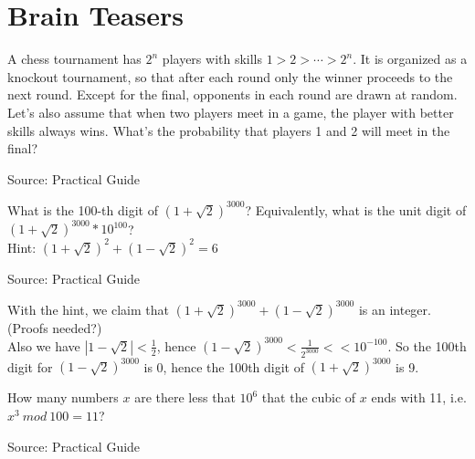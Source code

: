 \chapter{Brain Teasers}

\begin{exe}
A chess tournament has $2^n$ players with skills $1>2>\cdots>2^n$. It is organized as a
knockout tournament, so that after each round only the winner proceeds to the next
round. Except for the final, opponents in each round are drawn at random. Let's also
assume that when two players meet in a game, the player with better skills always wins.
What's the probability that players 1 and 2 will meet in the final?
\end{exe}
\begin{teacher}
Source: Practical Guide
\begin{sol}
\end{sol}
\end{teacher}

\begin{exe}[100th digit]
What is the 100-th digit of $(1+\sqrt{2})^{3000}$? Equivalently, what is the unit digit of $(1+\sqrt{2})^{3000}*10^{100}$?\\
Hint: $(1+\sqrt{2})^2 + (1-\sqrt{2})^2=6$
\end{exe}
\begin{teacher}
Source: Practical Guide
\begin{sol}
With the hint, we claim that $(1+\sqrt{2})^{3000} + (1-\sqrt{2})^{3000}$ is an integer. (Proofs needed?)\\
Also we have $|1-\sqrt{2}|<\frac{1}{2}$, hence $(1-\sqrt{2})^{3000}< \frac{1}{2^{3000}}<<10^{-100}$. So the 100th digit for $(1-\sqrt{2})^{3000}$ is 0, hence the 100th digit of $(1+\sqrt{2})^{3000}$ is 9.
\end{sol}
\end{teacher}

\begin{exe}
How many numbers $x$ are there less that $10^6$ that the cubic of $x$ ends with 11, i.e. $x^3\ mod\  100=11$?
\end{exe}
\begin{teacher}
Source: Practical Guide
\begin{sol}
\end{sol}
\end{teacher}